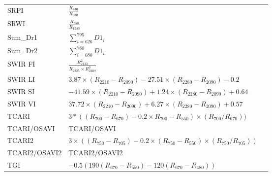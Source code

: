 \documentclass[remotesensing,article,submit,moreauthors,pdftex]{Definitions/mdpi}
\begin{document}
{\begin{supertabular}{lll}
		SRPI            & $\frac{R_{430}}{R_{680}}$                                                                            & \cite{penuelasj.1995}         \\
		SRWI            & $\frac{R_{850}}{R_{1240}}$                                                                           & \cite{zarco-tejada2003}      \\
		Sum\_Dr1        & $\sum_{i=626}^{795} D1_i$                                                                            & \cite{elvidge1995}            \\
		Sum\_Dr2        & $\sum_{i=680}^{780} D1_i$                                                                            & \cite{filella1994}            \\
		SWIR FI         & $\frac{R_{2133}^2}{R_{2225} \times R_{2209}^3}$                                                      & \cite{levin2007}              \\
		\midrule
		SWIR LI         & \parbox{3.8cm}{$3.87  \times (R_{2210} - R_{2090}) - 27.51 \times (R_{2280} - R_{2090}) - 0.2$}      & \cite{lobell2001}             \\
		\midrule
		SWIR SI         & \parbox{3.8cm}{$-41.59 \times (R_{2210} - R_{2090}) + 1.24 \times (R_{2280} - R_{2090}) + 0.64 $}    & \cite{lobell2001}             \\
		\midrule
		SWIR VI         & \parbox{3.8cm}{$37.72  \times (R_{2210} - R_{2090}) + 6.27 \times (R_{2280} - R_{2090}) + 0.57$}     & \cite{lobell2001}             \\
		\midrule
		TCARI           & \parbox{3.8cm}{$3*((R_{700}-R_{670})-0.2\times R_{700}-R_{550})\times (R_{700}/R_{670}))$}           & \cite{haboudane2002}          \\
		\midrule
		TCARI/OSAVI     & TCARI/OSAVI                                                                                          & \cite{haboudane2002}          \\
		\midrule
		TCARI2          & \parbox{3.8cm}{$3 \times ((R_{750}-R_{705})-0.2 \times (R_{750}-R_{550}) \times (R_{750}/R_{705}))$} & \cite{wu2008}                \\
		\midrule
		TCARI2/OSAVI2   & TCARI2/OSAVI2                                                                                        & \cite{wu2008}                \\
		\midrule
		TGI             & \parbox{3.8cm}{$-0.5 (190 (R_{670} - R_{550} ) - 120 (R_{670} - R_{480}))$}                          & \cite{hunt2013}               \\

\end{supertabular}}
\end{document}
